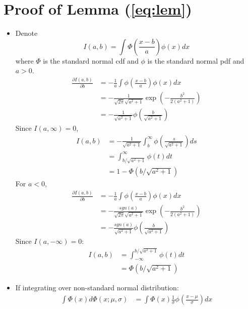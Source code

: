 \documentclass[12pt]{article}
\begin{document}
\section{Proof of Lemma (\ref{eq:lem})}
\label{sec:proof}
\begin{itemize}
\item Denote
  \begin{displaymath}
    I(a,b) = \int \Phi \left( \frac{x-b}{a} \right)\phi(x) dx 
  \end{displaymath}
  where $\Phi$ is the standard normal cdf and $\phi$ is the standard
  normal pdf and $a > 0$.
  \begin{align*}
    \frac{\partial I(a,b)}{\partial b} & = - \frac{1}{a} \int \phi \left( \frac{x-b}{a} \right) \phi(x) dx \\
    & = - \frac{1}{\sqrt{2 \pi} \sqrt{a^2+1}} \exp \left( - \frac{b^2}{2(a^2+1)} \right)\\
    & = -\frac{1}{\sqrt{a^2+1}} \phi \left( \frac{b}{\sqrt{a^2+1}}
    \right)
  \end{align*}
  Since $I(a, \infty) = 0$,
  \begin{align}
    I(a,b) &= - \frac{1}{\sqrt{a^2+1}} \int_b^{\infty} \phi \left( \frac{s}{\sqrt{a^2+1}} \right) ds \nonumber \\
    &= \int_{b/\sqrt{a^2+1}}^{\infty} \phi(t) dt \nonumber\\
    \label{eq:int}
    & = 1- \Phi(b/\sqrt{a^2+1})
  \end{align}
  For $a < 0$,
  \begin{align*}
    \frac{\partial I(a,b)}{\partial b} & = - \frac{1}{a} \int \phi \left( \frac{x-b}{a} \right) \phi(x) dx \\
    & = - \frac{sgn(a)}{\sqrt{2 \pi} \sqrt{a^2+1}} \exp \left( - \frac{b^2}{2(a^2+1)} \right)\\
    & = -\frac{sgn(a)}{\sqrt{a^2+1}} \phi \left(
      \frac{b}{\sqrt{a^2+1}} \right)
  \end{align*}
  Since $I(a, -\infty) = 0$:
  \begin{align}
    I(a,b) &= \int^{b/\sqrt{a^2+1}}_{-\infty} \phi(t) dt \nonumber\\
    \label{eq:intneg}
    & = \Phi(b/\sqrt{a^2+1})
  \end{align}
\item If integrating over non-standard normal distribution:
  \begin{align*}
    \int \Phi(x)d\Phi(x; \mu, \sigma) & = \int \Phi(x) \frac{1}{\sigma} \phi \left( \frac{x-\mu}{\sigma} \right) dx \\

\end{align*}
\end{itemize}
\end{document}
